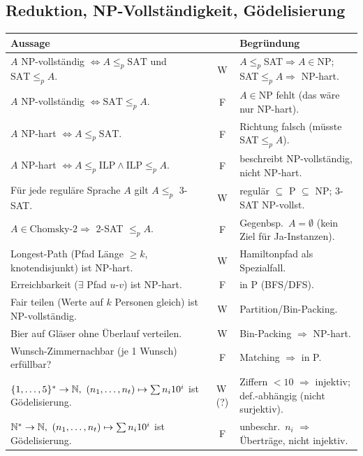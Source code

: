 \subsection{Reduktion, NP-Vollständigkeit, Gödelisierung}
\begin{mytable}
    \begin{tabular}{@{}p{} c p{}@{}}
        \hline
        \textbf{Aussage} & \textbf{} & \textbf{Begründung}\\
        \hline
        $A$ NP-vollständig $\iff A\le_p\text{SAT}$ und $\text{SAT}\le_p A$.
        & W & $A\le_p$SAT$\Rightarrow A\in$NP; SAT$\le_p A\Rightarrow$ NP-hart.\\
        $A$ NP-vollständig $\iff \text{SAT}\le_p A$.
        & F & $A\in$NP fehlt (das wäre nur NP-hart).\\
        $A$ NP-hart $\iff A\le_p\text{SAT}$.
        & F & Richtung falsch (müsste SAT$\le_p A$).\\
        $A$ NP-hart $\iff A\le_p\text{ILP}\wedge\text{ILP}\le_p A$.
        & F & beschreibt NP-vollständig, nicht NP-hart.\\
        Für jede reguläre Sprache $A$ gilt $A\le_p$ 3-SAT. & W & regulär $\subseteq$ P $\subseteq$ NP; 3-SAT NP-vollst.\\
        $A\in\text{Chomsky-2}\Rightarrow$ 2-SAT $\le_p A$.
        & F & Gegenbsp.\ $A=\emptyset$ (kein Ziel für Ja-Instanzen).\\
        Longest-Path (Pfad Länge $\ge k$, knotendisjunkt) ist NP-hart.
        & W & Hamiltonpfad als Spezialfall.\\
        Erreichbarkeit ($\exists$ Pfad $u$-$v$) ist NP-hart.
        & F & in P (BFS/DFS).\\
        Fair teilen (Werte auf $k$ Personen gleich) ist NP-vollständig.
        & W & Partition/Bin-Packing.\\
        Bier auf Gläser ohne Überlauf verteilen.
        & W & Bin-Packing $\Rightarrow$ NP-hart.\\
        Wunsch-Zimmernachbar (je 1 Wunsch) erfüllbar?
        & F & Matching $\Rightarrow$ in P.\\
        $\{1,\dots,5\}^*\to\mathbb{N},\ (n_1,\dots,n_t)\mapsto\sum n_i 10^i$ ist Gödelisierung.
        & W\,(?) & Ziffern $<10$ $\Rightarrow$ injektiv; def.-abhängig (nicht surjektiv).\\
        $\nz^*\to\nz,\ (n_1,\dots,n_t)\mapsto\sum n_i 10^i$ ist Gödelisierung.
        & F & unbeschr.\ $n_i$ $\Rightarrow$
        Überträge, nicht injektiv.\\

\end{tabular}
\end{mytable}

